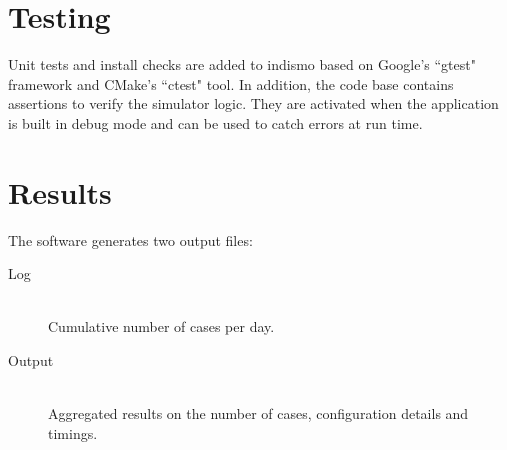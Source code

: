 \section{Testing}
Unit tests and install checks are added to indismo based on Google's ``gtest" framework and CMake's ``ctest" tool. 
In addition, the code base contains assertions to verify the simulator logic. 
They are activated when the application is built in debug mode and can be used to catch errors at run time. 




\section{Results}
\label{section:Results}

The software generates two output files:
\begin{description}
	\item [Log] \ \\
	Cumulative number of cases per day.
	\item [Output] \ \\
	Aggregated results on the number of cases, configuration details and timings.
\end{description}	
	
	
	
